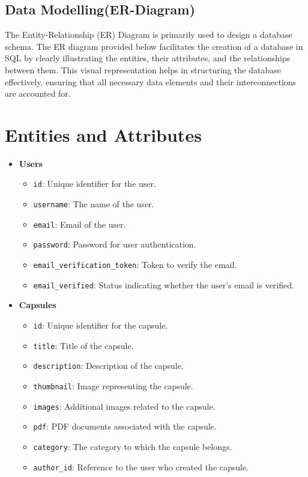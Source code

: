 \subsection{Data Modelling(ER-Diagram)}
The Entity-Relationship (ER) Diagram is primarily used to design a database schema. The ER diagram provided below facilitates the creation of a database in SQL by clearly illustrating the entities, their attributes, and the relationships between them. This visual representation helps in structuring the database effectively, ensuring that all necessary data elements and their interconnections are accounted for.
\section*{Entities and Attributes}
\begin{itemize}
    \item \textbf{Users}
    \begin{itemize}
        \item \texttt{id}: Unique identifier for the user.
        \item \texttt{username}: The name of the user.
        \item \texttt{email}: Email of the user.
        \item \texttt{password}: Password for user authentication.
        \item \texttt{email\_verification\_token}: Token to verify the email.
        \item \texttt{email\_verified}: Status indicating whether the user's email is verified.
    \end{itemize}
    
    \item \textbf{Capsules}
    \begin{itemize}
        \item \texttt{id}: Unique identifier for the capsule.
        \item \texttt{title}: Title of the capsule.
        \item \texttt{description}: Description of the capsule.
        \item \texttt{thumbnail}: Image representing the capsule.
        \item \texttt{images}: Additional images related to the capsule.
        \item \texttt{pdf}: PDF documents associated with the capsule.
        \item \texttt{category}: The category to which the capsule belongs.
        \item \texttt{author\_id}: Reference to the user who created the capsule.
    \end{itemize}
    

\end{itemize}
